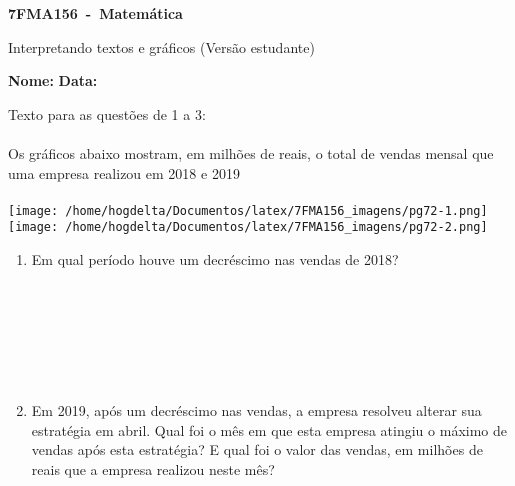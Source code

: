 \documentclass[a4paper,14pt]{article}
\begin{document}
	
	\noindent\textbf{7FMA156~-~Matemática} 
	
	\begin{center}Interpretando textos e gráficos (Versão estudante)
	\end{center}
	
	
	\noindent\textbf{Nome:} \underline{\hspace{10cm}}
    \noindent\textbf{Data:} \underline{\hspace{4cm}}
	
	
	\begin{multicols}{2}
		Texto para as questões de 1 a 3: \\\\
		Os gráficos abaixo mostram, em milhões de reais, o total de vendas mensal que uma empresa realizou em 2018 e 2019 \\\\
		\texttt{[image: /home/hogdelta/Documentos/latex/7FMA156\_imagens/pg72-1.png]} \\
		\texttt{[image: /home/hogdelta/Documentos/latex/7FMA156\_imagens/pg72-2.png]}
		\begin{enumerate}
			\item Em qual período houve um decréscimo nas vendas de 2018? 
			\\\\\\\\\\\\\\
			\item Em 2019, após um decréscimo nas vendas, a empresa resolveu alterar sua estratégia em abril. Qual foi o mês em que esta empresa atingiu o máximo de vendas após esta estratégia? E qual foi o valor das vendas, em milhões de reais que a empresa realizou neste mês? 
			\\\\\\\\\\\\\\\\\\\\\\

\end{enumerate}
\end{multicols}
\end{document}

